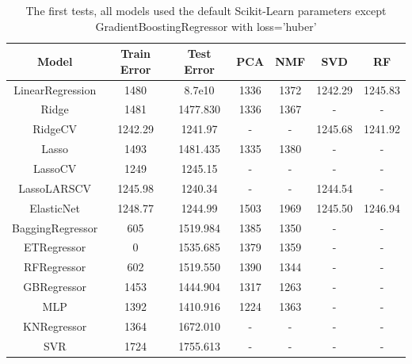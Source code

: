 \documentclass[a4paper]{article}
\begin{document}
\begin{table}[H]
\begin{tabular}{ |c|c|c|c|c|c|c| }
\hline
Model                     & Train Error & Test Error     &  PCA & NMF & SVD & RF \\
\hline
LinearRegression          & 1480        & 8.7e10 & 1336            & 1372 & 1242.29 & 1245.83 \\
Ridge                     & 1481        & 1477.830       & 1336            & 1367 & -       & -       \\
RidgeCV                   & 1242.29     & 1241.97        & -               & -    & 1245.68 & 1241.92 \\
Lasso                     & 1493        & 1481.435       & 1335            & 1380 &    -    &    -    \\
LassoCV                   & 1249        & 1245.15        & -               &  -   &    -    &    -    \\
LassoLARSCV               & 1245.98     & 1240.34        & -               & -    & 1244.54 &    -    \\
ElasticNet                & 1248.77     & 1244.99        & 1503            & 1969 & 1245.50 & 1246.94 \\
BaggingRegressor          & 605         & 1519.984       & 1385            & 1350 & -       &    -    \\
ETRegressor       & 0           & 1535.685       & 1379            & 1359 & -       &    -    \\
RFRegressor     & 602         & 1519.550       & 1390            & 1344 & -       &    -    \\
GBRegressor & 1453        & 1444.904       & 1317            & 1263 & -       &    -    \\
MLP                       & 1392        & 1410.916       & 1224            & 1363 & -       &    -    \\
KNRegressor       & 1364        & 1672.010       & -               & -    & -       &    -    \\
SVR                       & 1724        & 1755.613       & -               & -    & -       &    -    \\
\hline
\end{tabular}
\caption{\label{tab:start}The first tests, all models used the default Scikit-Learn parameters except GradientBoostingRegressor with loss='huber'}
\end{table}
\end{document}

